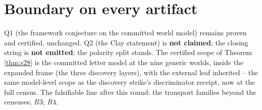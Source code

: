 \documentclass[11pt]{article}
\begin{document}
\section*{Boundary on every artifact}

Q1 (the framework conjecture on the committed world model) remains proven and
certified, unchanged. Q2 (the Clay statement) is \textbf{not claimed}; the
closing string is \textbf{not emitted}; the polarity split stands. The
certified scope of Theorem \ref{thm:s28} is the committed letter model at the
nine generic worlds, inside the expanded frame (the three discovery layers),
with the external leaf inherited -- the same model-level scope as the
discovery strike's discriminator receipt, now at the full census. The
falsifiable line after this round: the transport families beyond the
censuses; $R3$; $R4$.
\end{document}
